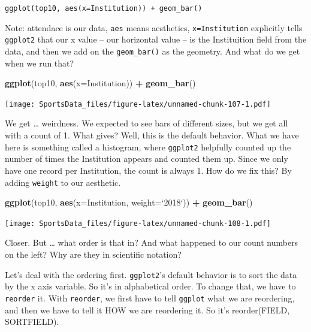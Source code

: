 \documentclass[]{book}
\newenvironment{Shaded}{\begin{snugshade}}{\end{snugshade}}
\newcommand{\KeywordTok}[1]{\textcolor[rgb]{0.13,0.29,0.53}{\textbf{#1}}}
\newcommand{\DataTypeTok}[1]{\textcolor[rgb]{0.13,0.29,0.53}{#1}}
\newcommand{\StringTok}[1]{\textcolor[rgb]{0.31,0.60,0.02}{#1}}
\newcommand{\OperatorTok}[1]{\textcolor[rgb]{0.81,0.36,0.00}{\textbf{#1}}}
\newcommand{\NormalTok}[1]{#1}
\begin{document}
\texttt{ggplot(top10,\ aes(x=Institution))\ +\ geom\_bar()}

Note: attendace is our data, \texttt{aes} means aesthetics,
\texttt{x=Institution} explicitly tells \texttt{ggplot2} that our x
value -- our horizontal value -- is the Instituition field from the
data, and then we add on the \texttt{geom\_bar()} as the geometry. And
what do we get when we run that?

\begin{Shaded}
\begin{Highlighting}[]
\KeywordTok{ggplot}\NormalTok{(top10, }\KeywordTok{aes}\NormalTok{(}\DataTypeTok{x=}\NormalTok{Institution)) }\OperatorTok{+}\StringTok{ }\KeywordTok{geom_bar}\NormalTok{()}
\end{Highlighting}
\end{Shaded}

\texttt{[image: SportsData\_files/figure-latex/unnamed-chunk-107-1.pdf]}

We get \ldots{} weirdness. We expected to see bars of different sizes,
but we get all with a count of 1. What gives? Well, this is the default
behavior. What we have here is something called a histogram, where
\texttt{ggplot2} helpfully counted up the number of times the
Institution appears and counted them up. Since we only have one record
per Institution, the count is always 1. How do we fix this? By adding
\texttt{weight} to our aesthetic.

\begin{Shaded}
\begin{Highlighting}[]
\KeywordTok{ggplot}\NormalTok{(top10, }\KeywordTok{aes}\NormalTok{(}\DataTypeTok{x=}\NormalTok{Institution, }\DataTypeTok{weight=}\StringTok{`}\DataTypeTok{2018}\StringTok{`}\NormalTok{)) }\OperatorTok{+}\StringTok{ }\KeywordTok{geom_bar}\NormalTok{()}
\end{Highlighting}
\end{Shaded}

\texttt{[image: SportsData\_files/figure-latex/unnamed-chunk-108-1.pdf]}

Closer. But \ldots{} what order is that in? And what happened to our
count numbers on the left? Why are they in scientific notation?

Let's deal with the ordering first. \texttt{ggplot2}'s default behavior
is to sort the data by the x axis variable. So it's in alphabetical
order. To change that, we have to \texttt{reorder} it. With
\texttt{reorder}, we first have to tell \texttt{ggplot} what we are
reordering, and then we have to tell it HOW we are reordering it. So
it's reorder(FIELD, SORTFIELD).
\end{document}
